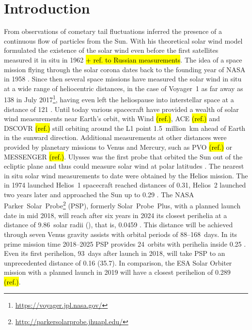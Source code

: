 \section{Introduction}

From observations of cometary tail fluctuations \citet{Biermann1951} inferred the presence of a continuous flow of particles from the Sun. With his theoretical solar wind model \citet{Parker1958} formulated the existence of the solar wind even before the first satellites measured it in situ in 1962 \citep{Neugebauer1966} \hl{+ ref. to Russian measurements}.
The idea of a space mission flying through the solar corona dates back to the founding year of NASA in 1958 \citep{McComas2008}. Since then several space missions have measured the solar wind in situ at a wide range of heliocentric distances, in the case of Voyager~1 as far away as \SI{138}{\au} in July 2017\footnote{\url{https://voyager.jpl.nasa.gov/}}, having even left the heliospause into interstellar space at a distance of \SI{121}{\au} \citep{Gurnett2013}.
Until today various spacecraft have provided a wealth of solar wind measurements near Earth’s orbit, with Wind \hl{(ref.)}, ACE \hl{(ref.)} and DSCOVR \hl{(ref.)} still orbiting around the L1 point \SI{1.5}{million \km} ahead of Earth in the sunward direction. Additional measurements at other distances were provided by planetary missions to Venus and Mercury, such as PVO \hl{(ref.)} or MESSENGER \hl{(ref.)}. Ulysses was the first probe that orbited the Sun out of the ecliptic plane and thus could measure solar wind at polar latitudes \citep{McComas1998}. The nearest in situ solar wind measurements to date were obtained by the Helios mission. The in 1974 launched Helios~1 spacecraft reached distances of \SI{0.31}{\au}, Helios~2 launched two years later and approached the Sun up to \SI{0.29}{\au} \citep{Rosenbauer1977}.
The NASA Parker~Solar~Probe\footnote{\url{http://parkersolarprobe.jhuapl.edu/}} (PSP), formerly Solar~Probe~Plus, with a planned launch date in mid 2018, will reach after six years in 2024 its closest perihelia at a distance of 9.86~solar radii (\Rs), that is, \SI{0.0459}{\au} \citep{Fox2015}. This distance will be achieved through seven Venus gravity assists with orbital periods of 88--168~days. In its prime mission time 2018--2025 PSP provides 24~orbits with perihelia inside \SI{0.25}{\au} \citep{Fox2015}. Even its first perihelion, 93~days after launch in 2018, will take PSP to an unprecedented distance of \SI{0.16}{\au} (\SI{35.7}{\Rs}). {\color{Red2} In comparison, the ESA Solar Orbiter mission with a planned launch in 2019 will have a closest perihelion of \SI{0.289}{\au} \hl{(ref.)}.}

